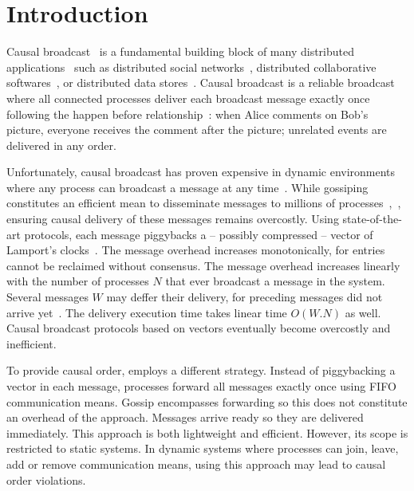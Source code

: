 
\section{Introduction}

Causal broadcast~\cite{hadzilacos1994modular} is a fundamental building block of
many distributed applications~\cite{nakamoto2009bitcoin} such as distributed
social networks~\cite{borthakur2013petabyte}, distributed collaborative
softwares~\cite{nedelec2016crate,heinrich2012exploiting}, or distributed data
stores~\cite{demers1987epidemic,shapiro2011comprehensive,bailis2013bolton,lloyd2011cops,bravo2017saturn}.
Causal broadcast is a reliable broadcast where all connected processes
deliver each broadcast message exactly once following the happen
before relationship~\cite{lamport1978time,schwarz1994detecting}: when
Alice comments on Bob's picture, everyone receives the comment after the
picture; unrelated events are delivered in any order.

Unfortunately, causal broadcast has proven expensive in dynamic environments
where any process can broadcast a message at any
time~\cite{charronbost1991concerning}. While gossiping constitutes an efficient
mean to disseminate messages to millions of
processes~\cite{demers1987epidemic},~\cite{birman1999bimodal}, ensuring causal
delivery of these messages remains overcostly.  Using state-of-the-art
protocols, each message piggybacks a -- possibly compressed -- vector of
Lamport's
clocks~\cite{almeida2008interval,fidge1988timestamps,mattern1989virtual,singhal1992efficient}.
The message overhead increases monotonically, for entries cannot be reclaimed
without consensus. The message overhead increases linearly with the number of
processes $N$ that ever broadcast a message in the system. Several messages $W$
may deffer their delivery, for preceding messages did not arrive
yet~\cite{mehdi2017slowdown}.  The delivery execution time takes linear time
$O(W.N)$ as well.  Causal broadcast protocols based on vectors eventually become
overcostly and inefficient.


To provide causal order, \cite{friedman2004causal} employs a different
strategy. Instead of piggybacking a vector in each message, processes forward
all messages exactly once using FIFO communication means. Gossip encompasses
forwarding so this does not constitute an overhead of the approach.  Messages
arrive ready so they are delivered immediately. This approach is both
lightweight and efficient. However, its scope is restricted to static systems.
In dynamic systems where processes can join, leave, add or remove communication
means, using this approach may lead to causal order violations.


